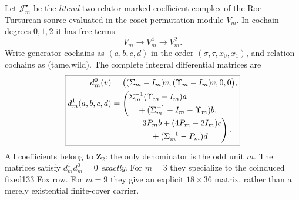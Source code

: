 \begin{theorem}
\label{thm:dyadic-f135-uniform-coinduced-fox}
Let
$\mathcal J_m^\bullet$
be the \emph{literal}
two-relator marked
coefficient complex
of the
Roe--Turturean
source evaluated
in the coset
permutation module
$V_m$.
In cochain
degrees $0,1,2$
it has free terms
\[
V_m\longrightarrow
V_m^4\longrightarrow
V_m^2.
\]
Write generator
cochains as
$(a,b,c,d)$ in
the order
$(\sigma,\tau,x_0,x_1)$,
and relation cochains
as (tame,wild).
The complete
integral differential
matrices are
\begin{equation}\label{eq:dyadic-f135-uniform-fox-differentials}
\boxed{
\begin{aligned}
d_m^0(v)&=
\bigl(
(\Sigma_m-I_m)v,
(\Upsilon_m-I_m)v,
0,0\bigr),\\
d_m^1(a,b,c,d)
&=
\left(
\begin{aligned}
&\Sigma_m^{-1}
(\Upsilon_m-I_m)a\\
&\quad+
(\Sigma_m^{-1}-I_m-\Upsilon_m)b,
\end{aligned}\right.\\[-2pt]
&\hspace{3.5em}
\left.
\begin{aligned}
&3P_m b+(4P_m-2I_m)c\\
&\quad+
(\Sigma_m^{-1}-P_m)d
\end{aligned}
\right).
\end{aligned}}
\end{equation}
All coefficients belong to
$\mathbf Z_2$:
the only denominator
is the odd unit $m$.
The matrices satisfy
$d_m^1d_m^0=0$
\emph{exactly}.
For $m=3$ they specialize
to the coinduced
fixed133 Fox row.
For $m=9$ they give an
explicit $18\times36$
matrix, rather than
a merely existential
finite-cover carrier.
\end{theorem}

